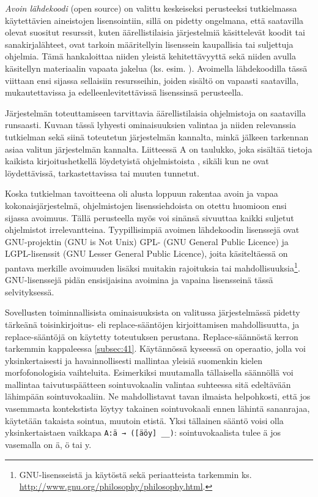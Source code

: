 \documentclass[free]{flammie}
\begin{document}
\textit{Avoin lähdekoodi} (open source)
on valittu keskeiseksi perusteeksi tutkielmassa käytettävien aineistojen
lisensointiin, sillä on pidetty ongelmana, että saatavilla olevat suositut
resurssit, kuten äärellistilaisia järjestelmiä käsittelevät koodit tai
sanakirjalähteet, ovat tarkoin määritellyin lisenssein kaupallisia tai
suljettuja ohjelmia. Tämä hankaloittaa niiden yleistä kehitettävyyttä sekä
niiden avulla käsitellyn materiaalin vapaata jakelua (ks. esim. \cite{yli2005toward}). Avoimella lähdekoodilla tässä viittaan ensi sijassa sellaisiin
resursseihin, joiden sisältö on vapaasti saatavilla, mukautettavissa ja
edelleenlevitettävissä lisenssinsä perusteella.

Järjestelmän toteuttamiseen tarvittavia äärellistilaisia ohjelmistoja on
saatavilla runsaasti. Kuvaan tässä lyhyesti ominaisuuksien valintaa ja niiden
relevanssia tutkielman sekä siinä toteutetun järjestelmän kannalta, minkä
jälkeen tarkennan asiaa valitun järjestelmän kannalta. Liitteessä A on taulukko,
joka sisältää tietoja kaikista kirjoitushetkellä löydetyistä ohjelmistoista
\cite{ylijyra2007}, sikäli kun ne ovat löydettävissä, tarkastettavissa tai muuten
tunnetut.

Koska tutkielman tavoitteena oli alusta loppuun rakentaa avoin ja vapaa
kokonaisjärjestelmä, ohjelmistojen lisenssiehdoista on otettu huomioon ensi
sijassa avoimuus. Tällä perusteella myös voi sinänsä sivuuttaa kaikki suljetut
ohjelmistot irrelevantteina. Tyypillisimpiä avoimen lähdekoodin lisenssejä ovat
GNU-projektin (GNU is Not Unix) GPL- (GNU General Public Licence) ja
LGPL-lisenssit (GNU Lesser General Public Licence), joita käsiteltäessä on
pantava merkille avoimuuden lisäksi muitakin rajoituksia tai
mahdollisuuksia\footnote{GNU-lisensseistä ja käytöstä sekä periaatteista
tarkemmin ks. \url{http://www.gnu.org/philosophy/philosophy.html}.}.  GNU-lisenssejä
pidän ensisijaisina avoimina ja vapaina lisensseinä tässä selvityksessä.

Sovellusten toiminnallisista ominaisuuksista on valitussa järjestelmässä pidetty
tärkeänä toisinkirjoitus- eli replace-sääntöjen kirjoittamisen mahdollisuutta,
ja replace-sääntöjä on käytetty toteutuksen perustana. Replace-säännöstä kerron
tarkemmin kappaleessa \ref{subsec:41}. Käytännössä kyseessä on operaatio, jolla voi
yksinkertaisesti ja havainnollisesti mallintaa yleisiä suomenkin kielen
morfofonologisia vaihteluita. Esimerkiksi muutamalla tällaisella säännöllä voi
mallintaa taivutuspäätteen sointuvokaalin valintaa suhteessa sitä edeltävään
lähimpään sointuvokaaliin. Ne mahdollistavat tavan ilmaista helpohkosti, että
jos vasemmasta kontekstista löytyy takainen sointuvokaali ennen lähintä
sananrajaa, käytetään takaista sointua, muutoin etistä. Yksi tällainen sääntö
voisi olla yksinkertaistaen vaikkapa \verb|A:ä → ([äöy] __)|: sointuvokaalista
tulee ä jos vasemalla on ä, ö tai y.
\end{document}
